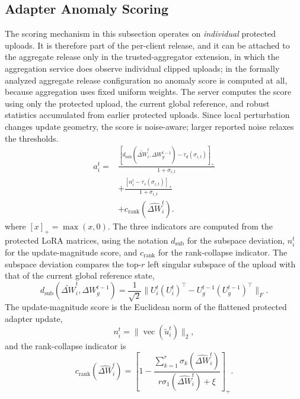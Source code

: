 \documentclass[a4paper,fleqn]{cas-dc}
\begin{document}
\subsection{Adapter Anomaly Scoring}
\label{subsec:anomaly-scoring}
The scoring mechanism in this subsection operates on \emph{individual}
protected uploads. It is therefore part of the per-client release, and it can
be attached to the aggregate release only in the trusted-aggregator
extension, in which the aggregation service does observe individual clipped
uploads; in the formally analyzed aggregate release configuration no anomaly
score is computed at all, because aggregation uses fixed uniform weights.
The server computes the score using only the protected upload, the current
global reference, and robust statistics accumulated from earlier protected
uploads. Since local perturbation changes update geometry, the score is
noise-aware; larger reported noise relaxes the thresholds.
\begin{equation}
\begin{aligned}
a_i^t =
&\frac{[d_{\mathrm{sub}}(\widetilde{\Delta W}_i^t,\Delta W_g^{t-1})-\tau_d(\sigma_{i,t})]_+}{1+\sigma_{i,t}}
\\
&+\frac{[n_i^t-\tau_s(\sigma_{i,t})]_+}{1+\sigma_{i,t}}
\\
&+c_{\mathrm{rank}}(\widehat{\Delta W}_i^t).
\end{aligned}
\end{equation}
where $[x]_+=\max(x,0)$. The three indicators are computed from the
protected LoRA matrices, using the notation $d_{\mathrm{sub}}$ for the
subspace deviation, $n_i^t$ for the update-magnitude score, and
$c_{\mathrm{rank}}$ for the rank-collapse indicator. The subspace deviation
compares the top-$r$ left singular subspace of the upload with that of the
current global reference state,
\begin{equation}
d_{\mathrm{sub}}(\widetilde{\Delta W}_i^t,\Delta W_g^{t-1})
=
\frac{1}{\sqrt{2}}\|U_i^t(U_i^t)^\top-U_g^{t-1}(U_g^{t-1})^\top\|_F .
\end{equation}
The update-magnitude score is the Euclidean norm of the flattened protected
adapter update,
\begin{equation}
n_i^t=\|\operatorname{vec}(\widetilde{u}_i^t)\|_2,
\end{equation}
and the rank-collapse indicator is
\begin{equation}
c_{\mathrm{rank}}(\widehat{\Delta W}_i^t)
=
\left[
1-
\frac{\sum_{k=1}^{r}\sigma_k(\widehat{\Delta W}_i^t)}
{r\sigma_1(\widehat{\Delta W}_i^t)+\xi}
\right]_+ .
\end{equation}
\end{document}
